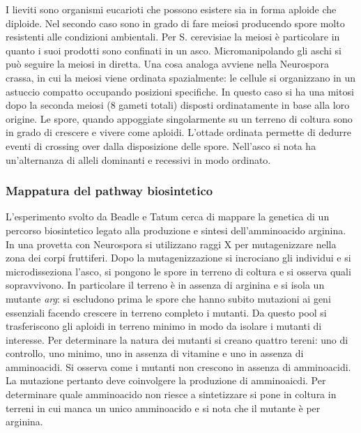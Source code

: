 I lieviti sono organismi eucarioti che possono esistere sia in forma aploide che diploide. Nel secondo caso sono in grado di fare meiosi producendo spore molto resistenti alle condizioni ambientali.
Per S. cerevisiae la meiosi \`e particolare in quanto i suoi prodotti sono confinati in un asco. Micromanipolando gli aschi si pu\`o seguire la meiosi in diretta. Una cosa analoga avviene nella 
Neurospora crassa, in cui la meiosi viene ordinata spazialmente: le cellule si organizzano in un astuccio compatto occupando posizioni specifiche. In questo caso si ha una mitosi dopo la seconda 
meiosi ($8$ gameti totali) disposti ordinatamente in base alla loro origine. Le spore, quando appoggiate singolarmente su un terreno di coltura sono in grado di crescere e vivere come aploidi. L'ottade
ordinata permette di dedurre eventi di crossing over dalla disposizione delle spore. Nell'asco si nota ha un'alternanza di alleli dominanti e recessivi in modo ordinato. 
\subsubsection{Mappatura del pathway biosintetico}
L'esperimento svolto da Beadle e Tatum cerca di mappare la genetica di un percorso biosintetico legato alla produzione e sintesi dell'amminoacido arginina. In una provetta con Neurospora si 
utilizzano raggi X per mutagenizzare nella zona dei corpi fruttiferi. Dopo la mutagenizzazione si incrociano gli individui e si microdisseziona l'asco, si pongono le spore in terreno di coltura e si
osserva quali sopravvivono. In particolare il terreno \`e in assenza di arginina e si isola un mutante \emph{arg}: si escludono prima le spore che hanno subito mutazioni ai geni essenziali facendo 
crescere in terreno completo i mutanti. Da questo pool si trasferiscono gli aploidi in terreno minimo in modo da isolare i mutanti di interesse. Per determinare la natura dei mutanti si creano quattro
tereni: uno di controllo, uno minimo, uno in assenza di vitamine e uno in assenza di amminoacidi. Si osserva come i mutanti non crescono in assenza di amminoacidi. La mutazione pertanto deve coinvolgere
la produzione di amminoaicdi. Per determinare quale amminoacido non riesce a sintetizzare si pone in coltura in terreni in cui manca un unico amminoacido e si nota che il mutante \`e per arginina. 
